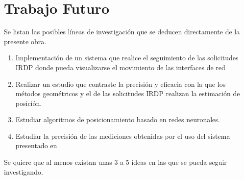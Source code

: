 \section{Trabajo Futuro}
Se listan las posibles líneas de investigación que se deducen directamente de la presente obra.

\begin{enumerate}
\item {Implementación de un sistema que realice el seguimiento de las solicitudes IRDP donde pueda visualizarse el movimiento de las interfaces de red}
\item{Realizar un estudio que contraste la precisión y eficacia con la que los métodos geométricos y el de las solicitudes IRDP realizan la estimación de posición.}
\item{Estudiar algoritmos de posicionamiento basado en redes neuronales.}
\item{Estudiar la precisión de las mediciones obtenidas por el uso del sistema presentado en \cite{8}}
\end{enumerate}

Se quiere que al menos existan unas 3 a 5 ideas en las que se pueda seguir investigando.

